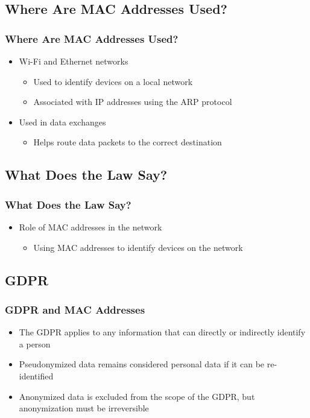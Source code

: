 \documentclass[
	11pt, %
]{beamer}
\begin{document}
\begin{frame}
  \section{Where Are MAC Addresses Used?}
  \frametitle{Where Are MAC Addresses Used?}
  \begin{itemize}
    \item Wi-Fi and Ethernet networks \pause
      \begin{itemize}
        \item Used to identify devices on a local network \pause
        \item Associated with IP addresses using the ARP protocol \pause
      \end{itemize}
    \item Used in data exchanges \pause
      \begin{itemize}
        \item Helps route data packets to the correct destination 
      \end{itemize}
  \end{itemize}
\end{frame}

\begin{frame}
  \section{What Does the Law Say?}
  \frametitle{What Does the Law Say?}
  \begin{itemize}
    \item Role of MAC addresses in the network \pause
      \begin{itemize}
        \item Using MAC addresses to identify devices on the network 
      \end{itemize}
  \end{itemize}
\end{frame}

\begin{frame}
  \section{GDPR}
  \frametitle{GDPR and MAC Addresses}
  \begin{itemize}
    \item The GDPR applies to any information that can directly or indirectly identify a person \pause
    \item Pseudonymized data remains considered personal data if it can be re-identified \pause
    \item Anonymized data is excluded from the scope of the GDPR, but anonymization must be irreversible 
  \end{itemize}
\end{frame}
\end{document}

